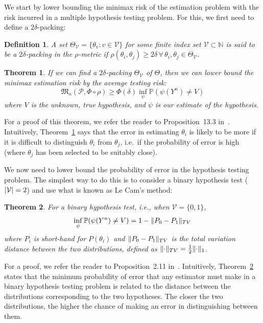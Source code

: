 \documentclass[conference]{IEEEtran}
\DeclarePairedDelimiter\abs{\lvert}{\rvert}
\DeclarePairedDelimiter\norm{\lVert}{\rVert}
\newcommand{\Phiorho}{\Phi\!\circ\!\rho}
\newtheorem{theorem}{Theorem}
\newtheorem{definition}{Definition}
\begin{document}
We start by lower bounding the minimax risk of the estimation problem with the
risk incurred in a multiple hypothesis testing problem. For this, we first need
to define a $2\delta$-packing:%
\begin{definition}
	A set $\Theta_{\mathcal{V}} = \{ \theta_v : v \in \mathcal{V} \}$ for some
	finite index set $\mathcal{V} \subset \mathbb N$ is said to be a
	$2\delta$-packing in the $\rho$-metric if $\rho(\theta_i, \theta_j) \geq
	2\delta \, \forall \, \theta_i, \theta_j \in \Theta_{\mathcal{V}}$.
\end{definition}
\begin{theorem} \label{thm:est-to-testing}%
	If we can find a $2\delta$-packing $\Theta_{\mathcal{V}}$ of $\Theta$, then
	we can lower bound the minimax estimation risk by the average testing risk:
	\begin{equation}
		\mathfrak{M}_n(\mathcal{P}, \Phiorho) \geq \Phi(\delta) \inf_\psi \mathbb P (\psi(Y^n) \neq V)
	\end{equation}
	where $V$ is the unknown, true hypothesis, and $\psi$ is our estimate of
	the hypothesis.
\end{theorem}
For a proof of this theorem, we refer the reader to Proposition~13.3
in~\cite{Duchi2015Information}.  Intuitively, Theorem~\ref{thm:est-to-testing}
says that the error in estimating $\theta_i$ is likely to be more if it is
difficult to distinguish $\theta_i$ from $\theta_j$, i.e.\ if the probability
of error is high (where $\theta_j$ has been selected to be suitably close).

We now need to lower bound the probability of error in the hypothesis testing
problem. The simplest way to do this is to consider a binary hypothesis test
($\abs{\mathcal{V}} = 2$) and use what is known as Le Cam's method:
\begin{theorem} \label{thm:le-cam}
	For a binary hypothesis test, i.e., when $\mathcal{V} = \{0, 1\}$,
	\begin{equation}
		\inf_\psi \mathbb P(\psi(Y^n) \neq V) = 1 - \norm{P_0 - P_1}_{TV}
	\end{equation}
	where $P_i$ is short-hand for $P(\theta_i)$ and $\norm{P_0 - P_1}_{TV}$ is
	the total variation distance between the two distributions, defined as
	$\norm{\cdot}_{TV} = \frac{1}{2} \norm{\cdot}_1$.
\end{theorem}
For a proof, we refer the reader to Proposition~2.11
in~\cite{Duchi2015Information}.  Intuitively, Theorem~\ref{thm:le-cam} states
that the minimum probability of error that any estimator must make in a binary
hypothesis testing problem is related to the distance between the distributions
corresponding to the two hypotheses. The closer the two distributions, the
higher the chance of making an error in distinguishing between them.
\end{document}
